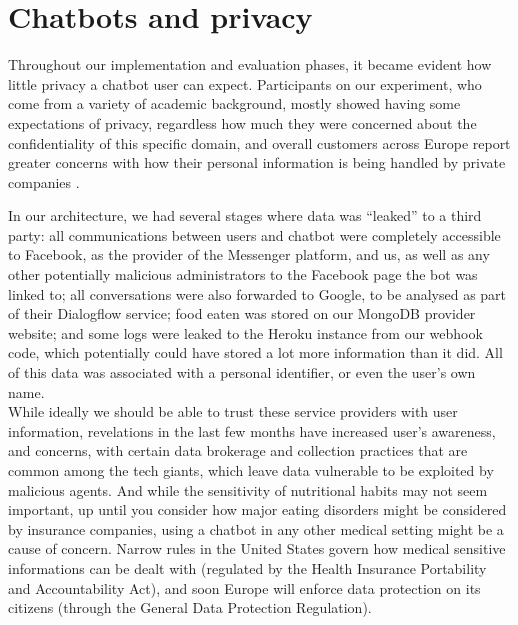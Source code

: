 \section{Chatbots and privacy}
Throughout our implementation and evaluation phases, it became evident how little privacy a chatbot user can expect. Participants on our experiment, who come from a variety of academic background, mostly showed having some expectations of privacy, regardless how much they were concerned about the confidentiality of this specific domain, and overall customers across Europe report greater concerns with how their personal information is being handled by private companies \cite{europasurvey}. 

In our architecture, we had several stages where data was ``leaked'' to a third party: all communications between users and chatbot were completely accessible to Facebook, as the provider of the Messenger platform, and us, as well as any other potentially malicious administrators to the Facebook page the bot was linked to; all conversations were also forwarded to Google, to be analysed as part of their Dialogflow service; food eaten was stored on our MongoDB provider website; and some logs were leaked to the Heroku instance from our webhook code, which potentially could have stored a lot more information than it did. All of this data was associated with a personal identifier, or even the user's own name. \\
While ideally we should be able to trust these service providers with user information, revelations in the last few months have increased user's awareness, and concerns, with certain data brokerage and collection practices that are common among the tech giants, which leave data vulnerable to be exploited by malicious agents. And while the sensitivity of nutritional habits may not seem important, up until you consider how major eating disorders might be considered by insurance companies, using a chatbot in any other medical setting might be a cause of concern. Narrow rules in the United States govern how medical sensitive informations can be dealt with (regulated by the Health Insurance Portability and Accountability Act), and soon Europe will enforce data protection on its citizens (through the General Data Protection Regulation). 


